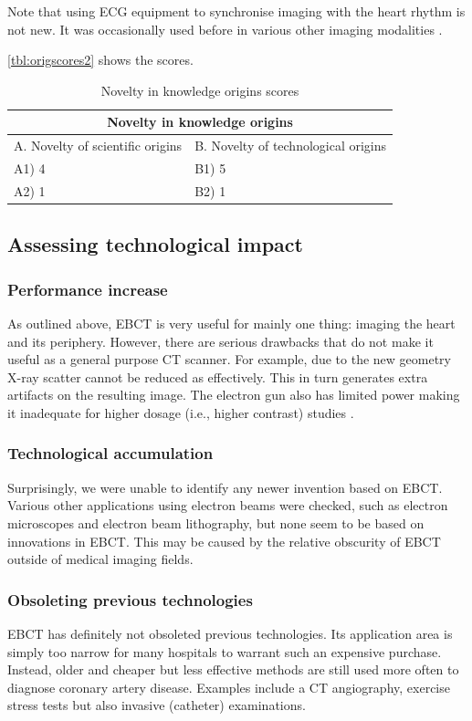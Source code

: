 Note that using ECG equipment to synchronise imaging with the heart rhythm is
not new. It was occasionally used before in various other imaging modalities
\cite{suetens}.

\autoref{tbl:origscores2} shows the scores.

\begin{table}[h]
\centering
\begin{tabular}{l l}
\hline
\multicolumn{2}{|c|}{Novelty in knowledge origins} \\
\hline
A. Novelty of scientific origins & B. Novelty of technological origins\\
A1) 4 & B1) 5\\ 
A2) 1 & B2) 1\\ 
\hline
\end{tabular}
\caption{Novelty in knowledge origins scores}
\label{tbl:origscores2}
\end{table}

\subsection{Assessing technological impact}
\subsubsection{Performance increase}
As outlined above, EBCT is very useful for mainly one thing: imaging the heart
and its periphery. However, there are serious drawbacks that do not make it
useful as a general purpose CT scanner. For example, due to the new geometry
X-ray scatter cannot be reduced as effectively. This in turn generates extra
artifacts on the resulting image. The electron gun also has limited power making
it inadequate for higher dosage (i.e., higher contrast) studies \cite{multictbook}.

\subsubsection{Technological accumulation}
Surprisingly, we were unable to identify any newer invention based on EBCT.
Various other applications using electron beams were checked, such as electron
microscopes and electron beam lithography, but none seem to be based on
innovations in EBCT. This may be caused by the relative obscurity of EBCT
outside of medical imaging fields.

\subsubsection{Obsoleting previous technologies}
EBCT has definitely not obsoleted previous technologies. Its application area is
simply too narrow for many hospitals to warrant such an expensive purchase.
Instead, older and cheaper but less effective methods are still used more often
to diagnose coronary artery disease. Examples include a CT angiography, exercise
stress tests but also invasive (catheter) examinations.

